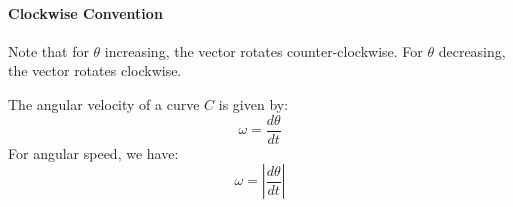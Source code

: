 \documentclass[11pt]{report}
\begin{document}
\paragraph{Clockwise Convention} Note that for $\theta$ increasing, the vector rotates counter-clockwise. For $\theta$ decreasing, the vector rotates clockwise.
\begin{definition}
    The angular velocity of a curve $C$ is given by:
    \begin{equation}
        \omega = \frac{d\theta}{dt}
    \end{equation}
    For angular speed, we have:
    \begin{equation}
        \omega = \left|\frac{d\theta}{dt}\right|
    \end{equation}
\end{definition}
\end{document}
